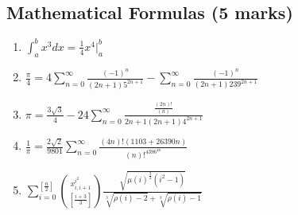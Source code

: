 \documentclass[12pt]{article}
\begin{document}
\subsection{Mathematical Formulas (5 marks)}
\boldmath
\begin{enumerate}
	\item $\displaystyle\int_a^b x^3 dx=\frac{1}{4}x^4\bigg\rvert_a^b$
	\item $\displaystyle\frac{\pi}{4}=4\sum\limits_{n=0}^{\infty}\frac{(-1)^n}{(2n+1)5^{2n+1}}-\sum\limits_{n=0}^\infty\frac{(-1)^n}{(2n+1)239^{2n+1}}$
	\item $\displaystyle\pi=\frac{3\sqrt{3}}{4}-24\sum\limits_{n=0}^{\infty}\frac{\frac{(2n)!}{(n)}}{2n+1(2n+1)4^{2n+1}}$
	\item $\displaystyle\frac{1}{\pi}=\frac{2\sqrt{2}}{9801}\sum\limits_{n=0}^{\infty}\frac{(4n)!(1103+26390n)}{(n)!^4396^{4n}}$
	\item $\displaystyle\sum\nolimits_{i=0}^{\left[\frac{n}{2} \right]}\binom{x^{i^2}_{i,i+1}}{\left[\frac{i+3}{3}\right]} \frac{\sqrt{\mu(i)^{\frac{3}{2}}(i^2-1)}}{\sqrt[3]{\rho(i)-2}+\sqrt[3]{\rho(i)-1}}$
\end{enumerate}
\newpage
\end{document}
